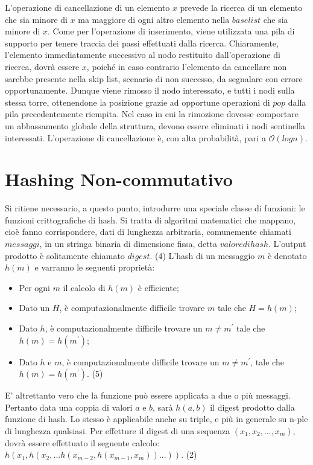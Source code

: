 			L'operazione di cancellazione di un elemento $ x $ prevede la ricerca di un elemento che sia minore di $ x $ ma maggiore di ogni altro elemento nella $base list$ che sia minore di $ x $. Come per l'operazione di inserimento, viene utilizzata una pila di supporto per tenere traccia dei passi effettuati dalla ricerca. Chiaramente, l'elemento immediatamente successivo al nodo restituito dall'operazione di ricerca, dovrà essere $ x $, poiché in caso contrario l'elemento da cancellare non sarebbe presente nella skip list, scenario di non successo, da segnalare con errore opportunamente.
			Dunque viene rimosso il nodo interessato, e tutti i nodi sulla stessa torre, ottenendone la posizione grazie ad opportune operazioni di $ pop $ dalla pila precedentemente riempita.
			Nel caso in cui la rimozione dovesse comportare un abbassamento globale della struttura, devono essere eliminati i nodi sentinella interessati.
			L'operazione di cancellazione è, con alta probabilità, pari a $\mathcal{O}(log{}n)$.
			
	
\section{Hashing Non-commutativo}
	

	Si ritiene necessario, a questo punto, introdurre una speciale classe di funzioni: le funzioni crittografiche di hash. Si tratta di algoritmi matematici che mappano, cioè fanno corrispondere, dati di lunghezza arbitraria, comunemente chiamati $ messaggi $, in un stringa binaria di dimensione fissa, detta $ valore di hash $. L'output prodotto è solitamente chiamato $ digest $. (4)
	L'hash di un messaggio $ m $ è denotato $ h(m) $ e varranno le seguenti proprietà:
	
	\begin{itemize}
		\item Per ogni $ m $ il calcolo di $ h(m) $ è efficiente;
		\item Dato un $ H $, è computazionalmente difficile trovare $ m $ tale che $ H = h(m) $;
		\item Dato $ h $, è computazionalmente difficile trovare un $ m \ne m^{'}$ tale che $ h(m) = h(m^{'}) $;
		\item Dato $ h $ e $ m $, è computazionalmente difficile trovare un $ m \ne m^{'} $, tale che $ h(m) = h(m^{'}) $. (5)
	\end{itemize}

	E' altrettanto vero che la funzione può essere applicata a due o più messaggi. Pertanto data una coppia di valori $ a $ e $ b $, sarà $ h(a,b) $ il digest prodotto dalla funzione di hash. Lo stesso è applicabile anche su triple, e più in generale su n-ple di lunghezza qualsiasi. Per effetture il digest di una sequenza $ (x_{1}, x_{2}, ... , x_{m}) $, dovrà essere effettuato il seguente calcolo: $ h(x_{1}, h(x_{2}, ... h(x_{m-2},h(x_{m-1},x_{m}))...)) $. (2)
	
